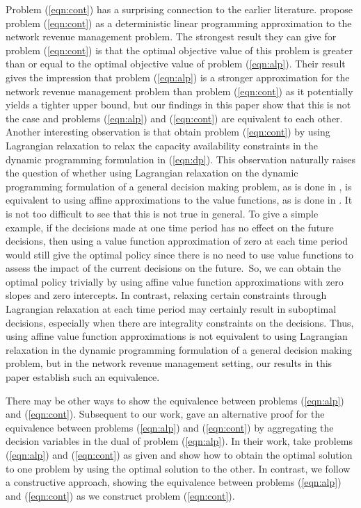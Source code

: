 Problem (\ref{eqn:cont}) has a surprising connection to the earlier literature.  propose problem (\ref{eqn:cont}) as a deterministic linear programming approximation to the network revenue management problem. The strongest result they can give for problem (\ref{eqn:cont}) is that the optimal objective value of this problem is greater than or equal to the optimal objective value of problem (\ref{eqn:alp}). Their result gives the impression that problem (\ref{eqn:alp}) is a stronger approximation for the network revenue management problem than problem (\ref{eqn:cont}) as it potentially yields a tighter upper bound, but our findings in this paper show that this is not the case and problems (\ref{eqn:alp}) and (\ref{eqn:cont}) are equivalent to each other. Another interesting observation is that  obtain problem (\ref{eqn:cont}) by using Lagrangian relaxation to relax the capacity availability constraints in the dynamic programming formulation in (\ref{eqn:dp}). This observation naturally raises the question of whether using Lagrangian relaxation on the dynamic programming formulation of a general decision making problem, as is done in , is equivalent to using affine approximations to the value functions, as is done in . It is not too difficult to see that this is not true in general. To give a simple example, if the decisions made at one time period has no effect on the future decisions, then using a value function approximation of zero at each time period would still give the optimal policy since there is no need to use value functions to assess the impact of the current decisions on the future.~So, we can obtain the optimal policy trivially by using affine value function approximations with zero slopes and zero intercepts. In contrast, relaxing certain constraints through Lagrangian relaxation at each time period may certainly result in suboptimal decisions, especially when there are integrality constraints on the decisions. Thus, using affine value function approximations is not equivalent to using Lagrangian relaxation in the dynamic programming formulation of a general decision making problem, but in the network revenue management setting, our results in this paper establish such an equivalence.

There may be other ways to show the equivalence between problems (\ref{eqn:alp}) and (\ref{eqn:cont}). Subsequent to our work,  gave an alternative proof for the equivalence  between problems (\ref{eqn:alp}) and (\ref{eqn:cont}) by aggregating the decision variables in the dual of problem (\ref{eqn:alp}). In their work,  take problems (\ref{eqn:alp}) and (\ref{eqn:cont}) as given and show how to obtain the optimal solution to one problem by using the optimal solution to the other. In contrast, we follow a constructive approach, showing the equivalence between problems (\ref{eqn:alp}) and (\ref{eqn:cont}) as we construct problem (\ref{eqn:cont}).



